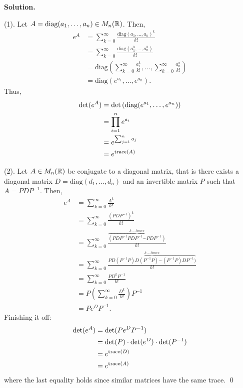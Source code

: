 \documentclass[12pt]{book}
\theoremstyle{definition}
\newenvironment{solution}
{%
  \par\noindent\textbf{Solution.}\quad
}
{%
  \qed\par
}
\begin{document}
\begin{solution}
  (1). Let $A = \text{diag}(a_1, \dots, a_n) \in M_n(\mathbb{R})$.
  Then,
  \[
  \begin{aligned}
    e^{A} &= \sum_{k=0}^\infty \frac{\text{diag}(a_1, \dots, a_n)^k}{k!} \\
          &= \sum_{k=0}^\infty \frac{\text{diag}(a_1^k, \dots, a_n^k)}{k!} \\
          &= \text{diag}\left(\sum_{k=0}^\infty \frac{a_1^k}{k!}, \dots , \sum_{k=0}^\infty \frac{a_n^k}{k!} \right) \\
          &= \text{diag}(e^{a_1}, \dots , e^{a_n}).
  \end{aligned}
  \]
  Thus,
  \[
  \begin{aligned}
  \det(e^A) &= \det \left(\text{diag}(e^{a_1}, \dots , e^{a_n})\right)\\
            &= \prod_{i = 1}^{n}e^{a_i} \\
            &= e^{\sum_{j=1}^n a_j} \\
            &= e^{\text{trace}({A})}
  \end{aligned}
  \]

  (2). Let $A \in M_n(\mathbb{R})$ be conjugate to a diagonal matrix, that is there exists a diagonal matrix $D = \text{diag}(d_1, \dots, d_n)$ and an invertible matrix $P$ such that $A = PDP^{-1}$.
  Then,
  \[
  \begin{aligned}
    e^A &= \sum_{k=0}^\infty \frac{A^k}{k!} \\
        &= \sum_{k=0}^\infty \frac{(PDP^{-1})^k}{k!} \\
        &= \sum_{k=0}^\infty \frac{\overbrace{(PDP^{-1}PDP^{-1} \cdots PDP^{-1})}^{k-times}}{k!} \\
        &= \sum_{k=0}^\infty \frac{\overbrace{PD(P^{-1}P)D(P^{-1}P) \cdots (P^{-1}P)DP^{-1})}^{k-times}}{k!} \\
        &= \sum_{k=0}^\infty \frac{PD^kP^{-1}}{k!} \\
        &= P \left( \sum_{k=0}^\infty \frac{D^k}{k!} \right) P^{-1} \\
        &= P e^D P^{-1}.
  \end{aligned}
  \]
  Finishing it off:
  \[
  \begin{aligned}
    \det(e^A) &= \det(Pe^DP^{-1}) \\
              &= \det(P) \cdot \det(e^D) \cdot \det(P^{-1}) \\
              &= e^{\text{trace}({D})} \\
              &= e^{\text{trace}({A})}
  \end{aligned}
  \]
  where the last equality holds since similar matrices have the same trace. 
\end{solution}
\end{document}
